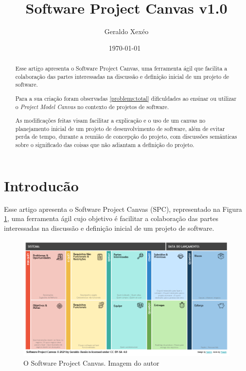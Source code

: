 \documentclass{article}
\title{Software Project Canvas v1.0}
\author{Geraldo Xexéo}
\date{\today \ \DTMcurrenttime }
\begin{document}
\maketitle

\begin{abstract}
\hspace*{\parindent}Esse artigo apresenta o Software Project Canvas, uma ferramenta ágil que facilita a colaboração das partes interessadas na  discussão e definição inicial de um projeto de software.

Para a sua  criação foram observadas \ref{problems:total} dificuldades  ao ensinar ou utilizar o \textit{Project Model Canvas} no contexto de projetos de software.

As modificações feitas visam facilitar a explicação e o uso de um canvas no planejamento inicial de um projeto de desenvolvimento de software, além de evitar perda de tempo, durante a reunião de concepção do projeto, com discussões semânticas sobre o significado das coisas que não adiantam a definição do projeto.
\end{abstract}

\section{Introducão}

Esse artigo apresenta o Software Project Canvas (SPC), representado na Figura \ref{fig:spc}, uma ferramenta ágil cujo objetivo é facilitar a colaboração das partes interessadas na  discussão e definição inicial de um projeto de software.

\begin{figure}[hbt]
    \centering
    \includegraphics[width=\textwidth]{imagens/Software Project Canvas Yasmin 1.png}
    \caption{O Software Project Canvas. Imagem do autor}
    \label{fig:spc}
\end{figure}
\end{document}
